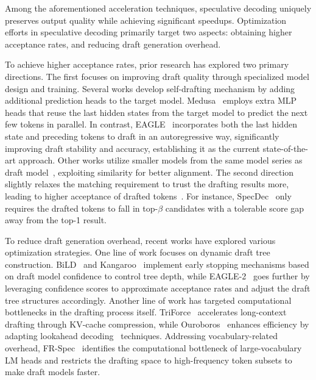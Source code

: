 \documentclass{article} %
\begin{document}
Among the aforementioned acceleration techniques, speculative decoding uniquely preserves output quality while achieving significant speedups. Optimization efforts in speculative decoding primarily target two aspects: obtaining higher acceptance rates, and reducing draft generation overhead. 

To achieve higher acceptance rates, prior research has explored two primary directions. The first focuses on improving draft quality through specialized model design and training. Several works develop self-drafting mechanism by adding additional prediction heads to the target model. Medusa~\citep{cai2024medusa} employs extra MLP heads that reuse the last hidden states from the target model to predict the next few tokens in parallel. In contrast, EAGLE~\citep{li2024eagle,li2024eagle2,li2025eagle3} incorporates both the last hidden state and preceding tokens to draft in an autoregressive way, significantly improving draft stability and accuracy, establishing it as the current state-of-the-art approach. Other works utilize smaller models from the same model series as draft model~\citep{leviathan2023fast,chen2025cascade}, exploiting similarity for better alignment. The second direction slightly relaxes the matching requirement to trust the drafting results more, leading to higher acceptance of drafted tokens~\citep{xia2024unlocking}. For instance, SpecDec~\citep{xia2023speculative} only requires the drafted tokens to fall in top-$\beta$ candidates with a tolerable score gap away from the top-1 result.

To reduce draft generation overhead, recent works have explored various optimization strategies. One line of work focuses on dynamic draft tree construction. BiLD~\citep{kim2023speculative} and Kangaroo~\citep{liu2024kangaroo} implement early stopping mechanisms based on draft model confidence to control tree depth, while EAGLE-2~\citep{li2024eagle2} goes further by leveraging confidence scores to approximate acceptance rates and adjust the draft tree structures accordingly. Another line of work has targeted computational bottlenecks in the drafting process itself. TriForce~\citep{sun2024triforce} accelerates long-context drafting through KV-cache compression, while Ouroboros~\citep{zhao2024ouroboros} enhances efficiency by adapting lookahead decoding~\citep{fu2024break} techniques. Addressing vocabulary-related overhead, FR-Spec~\citep{zhao2025frspec} identifies the computational bottleneck of large-vocabulary LM heads and restricts the drafting space to high-frequency token subsets to make draft models faster.
\end{document}
